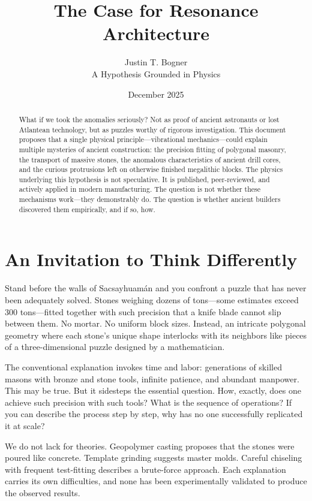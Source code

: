 \documentclass[11pt]{article}
\title{The Case for Resonance Architecture}
\author{Justin T. Bogner\\[0.5em]\small A Hypothesis Grounded in Physics}
\date{December 2025}
\begin{document}
\maketitle
\thispagestyle{empty}

\begin{abstract}
What if we took the anomalies seriously? Not as proof of ancient astronauts or lost Atlantean technology, but as puzzles worthy of rigorous investigation. This document proposes that a single physical principle---vibrational mechanics---could explain multiple mysteries of ancient construction: the precision fitting of polygonal masonry, the transport of massive stones, the anomalous characteristics of ancient drill cores, and the curious protrusions left on otherwise finished megalithic blocks. The physics underlying this hypothesis is not speculative. It is published, peer-reviewed, and actively applied in modern manufacturing. The question is not whether these mechanisms work---they demonstrably do. The question is whether ancient builders discovered them empirically, and if so, how.
\end{abstract}

\tableofcontents
\newpage

\section{An Invitation to Think Differently}

Stand before the walls of Sacsayhuamán and you confront a puzzle that has never been adequately solved. Stones weighing dozens of tons---some estimates exceed 300 tons---fitted together with such precision that a knife blade cannot slip between them. No mortar. No uniform block sizes. Instead, an intricate polygonal geometry where each stone's unique shape interlocks with its neighbors like pieces of a three-dimensional puzzle designed by a mathematician.

The conventional explanation invokes time and labor: generations of skilled masons with bronze and stone tools, infinite patience, and abundant manpower. This may be true. But it sidesteps the essential question. How, exactly, does one achieve such precision with such tools? What is the sequence of operations? If you can describe the process step by step, why has no one successfully replicated it at scale?

We do not lack for theories. Geopolymer casting proposes that the stones were poured like concrete. Template grinding suggests master molds. Careful chiseling with frequent test-fitting describes a brute-force approach. Each explanation carries its own difficulties, and none has been experimentally validated to produce the observed results.
\end{document}
